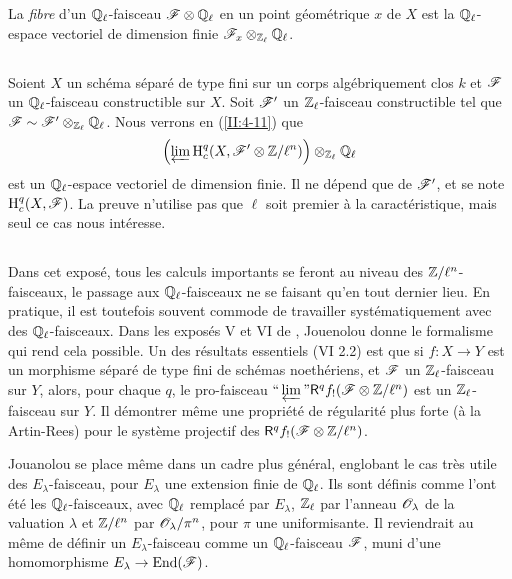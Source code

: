 \documentclass[oneside]{book}
\begin{document}
La \emph{fibre} d'un $\mathbb{Q}_\ell$-faisceau $\mathscr{F}\otimes\mathbb{Q}_\ell$ en un point 
géométrique $x$ de $X$ est la $\mathbb{Q}_\ell$-espace vectoriel de dimension 
finie $\mathscr{F}_x\otimes_{\mathbb{Z}_\ell}\mathbb{Q}_\ell$. 





\subsection{}\label{II:2-10}

Soient $X$ un schéma séparé de type fini sur un corps algébriquement 
clos $k$ et $\mathscr{F}$ un $\mathbb{Q}_\ell$-faisceau constructible sur $X$. Soit $\mathscr{F}'$ un 
$\mathbb{Z}_\ell$-faisceau constructible tel que 
$\mathscr{F}\sim \mathscr{F}'\otimes_{\mathbb{Z}_\ell}\mathbb{Q}_\ell$. Nous verrons en (\ref{II:4-11}) que 
\[
  \left(\varprojlim \operatorname{H}_c^q(X,\mathscr{F}'\otimes \mathbb{Z}/\ell^n)\right)\otimes_{\mathbb{Z}_\ell}\mathbb{Q}_\ell
\]
est un $\mathbb{Q}_\ell$-espace vectoriel de dimension finie. Il ne dépend que de 
$\mathscr{F}'$, et se note $\operatorname{H}_c^q(X,\mathscr{F})$. La preuve n'utilise pas que $\ell$ soit 
premier à la caractéristique, mais seul ce cas nous intéresse. 





\subsection{}\label{II:2-11}

Dans cet exposé, tous les calculs importants se feront au niveau des 
$\mathbb{Z}/\ell^n$-faisceaux, le passage aux $\mathbb{Q}_\ell$-faisceaux ne se faisant qu'en 
tout dernier lieu. En pratique, il est toutefois souvent commode de travailler 
systématiquement avec des $\mathbb{Q}_\ell$-faisceaux. Dans les exposés 
V et VI de \cite{SGA5}, Jouenolou donne le formalisme qui rend cela possible. 
Un des résultats essentiels (VI 2.2) est que si $f:X\to Y$ est un morphisme 
séparé de type fini de schémas noethériens, et $\mathscr{F}$ un 
$\mathbb{Z}_\ell$-faisceau sur $Y$, alors, pour chaque $q$, le pro-faisceau 
$\text{``}\varprojlim\text{''}\mathsf{R}^q f_! (\mathscr{F}\otimes\mathbb{Z}/\ell^n)$ est un 
$\mathbb{Z}_\ell$-faisceau sur $Y$. Il démontrer même une propriété de 
régularité plus forte (à la Artin-Rees) pour le système projectif des 
$\mathsf{R}^q f_!(\mathscr{F}\otimes\mathbb{Z}/\ell^n)$. 

Jouanolou se place même dans un cadre plus général, englobant le cas 
très utile des $E_\lambda$-faisceau, pour $E_\lambda$ une extension finie de 
$\mathbb{Q}_\ell$. Ils sont définis comme l'ont été les $\mathbb{Q}_\ell$-faisceaux, 
avec $\mathbb{Q}_\ell$ remplacé par $E_\lambda$, $\mathbb{Z}_\ell$ par l'anneau 
$\mathscr{O}_\lambda$ de la valuation $\lambda$ et $\mathbb{Z}/\ell^n$ par 
$\mathscr{O}_\lambda/\pi^n$, pour $\pi$ une uniformisante. Il reviendrait au même de 
définir un $E_\lambda$-faisceau comme un $\mathbb{Q}_\ell$-faisceau $\mathscr{F}$, muni 
d'une homomorphisme $E_\lambda\to\operatorname{End}(\mathscr{F})$. 
\end{document}
